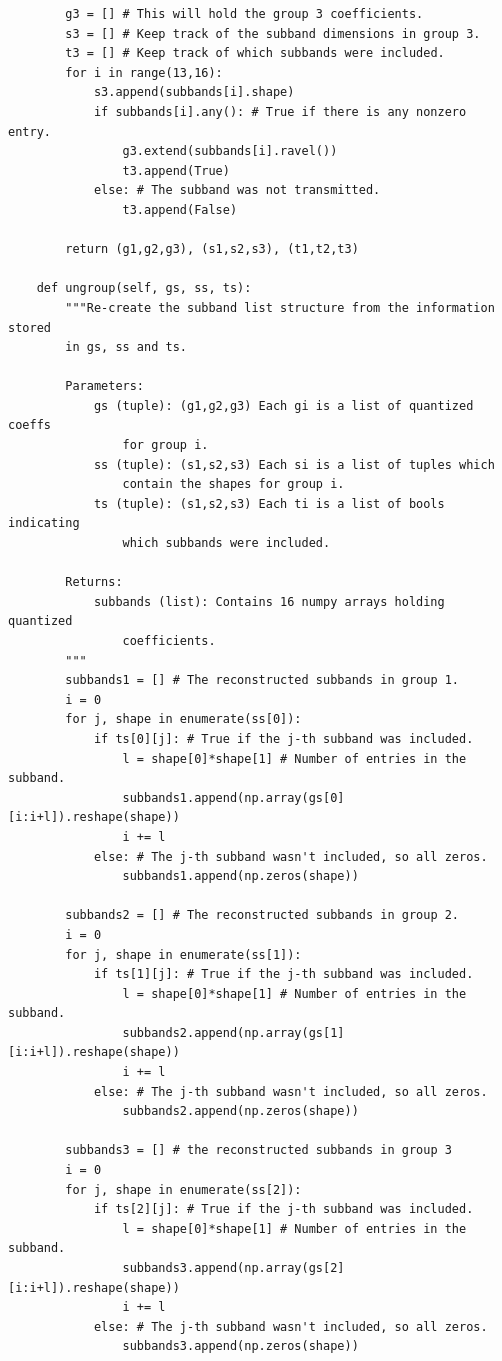 \begin{lstlisting}
        g3 = [] # This will hold the group 3 coefficients.
        s3 = [] # Keep track of the subband dimensions in group 3.
        t3 = [] # Keep track of which subbands were included.
        for i in range(13,16):
            s3.append(subbands[i].shape)
            if subbands[i].any(): # True if there is any nonzero entry.
                g3.extend(subbands[i].ravel())
                t3.append(True)
            else: # The subband was not transmitted.
                t3.append(False)

        return (g1,g2,g3), (s1,s2,s3), (t1,t2,t3)

    def ungroup(self, gs, ss, ts):
        """Re-create the subband list structure from the information stored
        in gs, ss and ts.

        Parameters:
            gs (tuple): (g1,g2,g3) Each gi is a list of quantized coeffs
                for group i.
            ss (tuple): (s1,s2,s3) Each si is a list of tuples which
                contain the shapes for group i.
            ts (tuple): (s1,s2,s3) Each ti is a list of bools indicating
                which subbands were included.

        Returns:
            subbands (list): Contains 16 numpy arrays holding quantized
                coefficients.
        """
        subbands1 = [] # The reconstructed subbands in group 1.
        i = 0
        for j, shape in enumerate(ss[0]):
            if ts[0][j]: # True if the j-th subband was included.
                l = shape[0]*shape[1] # Number of entries in the subband.
                subbands1.append(np.array(gs[0][i:i+l]).reshape(shape))
                i += l
            else: # The j-th subband wasn't included, so all zeros.
                subbands1.append(np.zeros(shape))

        subbands2 = [] # The reconstructed subbands in group 2.
        i = 0
        for j, shape in enumerate(ss[1]):
            if ts[1][j]: # True if the j-th subband was included.
                l = shape[0]*shape[1] # Number of entries in the subband.
                subbands2.append(np.array(gs[1][i:i+l]).reshape(shape))
                i += l
            else: # The j-th subband wasn't included, so all zeros.
                subbands2.append(np.zeros(shape))

        subbands3 = [] # the reconstructed subbands in group 3
        i = 0
        for j, shape in enumerate(ss[2]):
            if ts[2][j]: # True if the j-th subband was included.
                l = shape[0]*shape[1] # Number of entries in the subband.
                subbands3.append(np.array(gs[2][i:i+l]).reshape(shape))
                i += l
            else: # The j-th subband wasn't included, so all zeros.
                subbands3.append(np.zeros(shape))


\end{lstlisting}
